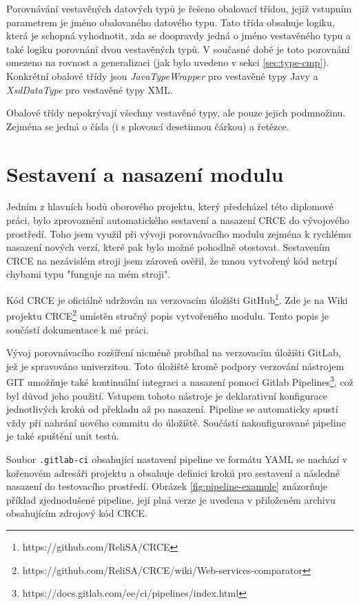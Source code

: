 \documentclass[czech,DP]{thesiskiv}
\begin{document}
Porovnávání vestavěných datových typů je řešeno obalovací třídou, jejíž vstupním parametrem je jméno obalovaného datového typu. Tato třída obsahuje logiku, která je schopná vyhodnotit, zda se doopravdy jedná o jméno vestavěného typu a také logiku porovnání dvou vestavěných typů. V současné době je toto porovnání omezeno na rovnost a generalizaci (jak bylo uvedeno v sekci \ref{sec:type-cmp}). Konkrétní obalové třídy jsou \textit{JavaTypeWrapper} pro vestavěné typy Javy a \textit{XsdDataType} pro vestavěné typy XML. 

Obalové třídy nepokrývají všechny vestavěné typy, ale pouze jejich podmnožinu. Zejména se jedná o čísla (i s plovoucí desetinnou čárkou) a řetězce.

\section{Sestavení a nasazení modulu}

Jedním z hlavních bodů oborového projektu, který předcházel této diplomové práci, bylo zprovoznění automatického sestavení a nasazení CRCE do vývojového prostředí. Toho jsem využil při vývoji porovnávacího modulu zejména k rychlému nasazení nových verzí, které pak bylo možné pohodlně otestovat. Sestavením CRCE na nezávislém stroji jsem zároveň ověřil, že mnou vytvořený kód netrpí chybami typu "funguje na mém stroji".

Kód CRCE je oficiálně udržován na verzovacím úložišti GitHub\footnote{https://github.com/ReliSA/CRCE}. Zde je na Wiki projektu CRCE\footnote{https://github.com/ReliSA/CRCE/wiki/Web-services-comparator} umístěn stručný popis vytvořeného modulu. Tento popis je součástí dokumentace k mé práci.

Vývoj porovnávacího rozšíření nicméně probíhal na verzovacím úložišti GitLab, jež je spravováno univerzitou. Toto úložiště  kromě podpory verzování nástrojem GIT umožňuje také kontinuální integraci a nasazení pomocí Gitlab Pipelines\footnote{https://docs.gitlab.com/ee/ci/pipelines/index.html}, což byl důvod jeho použití. Vstupem tohoto nástroje je deklarativní konfigurace jednotlivých kroků od překladu až po nasazení. Pipeline se automaticky spustí vždy při nahrání nového commitu do úložiště. Součástí nakonfigurované pipeline je také spuštění unit testů.

Soubor \verb|.gitlab-ci| obsahující nastavení pipeline ve formátu YAML se nachází v kořenovém adresáři projektu a obsahuje definici kroků pro sestavení a následné nasazení do testovacího prostředí. Obrázek \ref{fig:pipeline-example} znázorňuje příklad zjednodušené pipeline, její plná verze je uvedena v přiloženém archivu obsahujícím zdrojový kód CRCE. 
\end{document}
